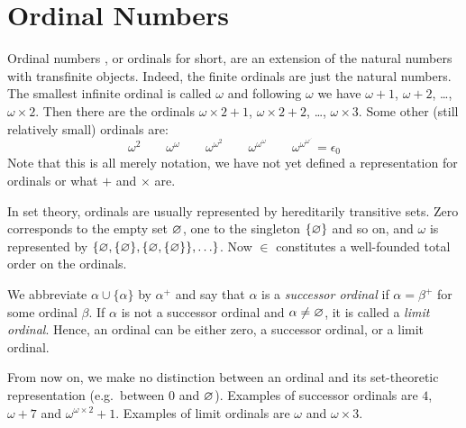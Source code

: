 


\section{Ordinal Numbers}\label{sec:ordinals}

Ordinal numbers \citep{cantor-15}, or ordinals for short, are an
extension of the natural numbers with transfinite objects. Indeed, the
finite ordinals are just the natural numbers. The smallest infinite
ordinal is called $\omega$ and following $\omega$ we have $\omega +
1$, $\omega + 2$, \ldots, $\omega \times 2$. Then there are the
ordinals $\omega \times 2 + 1$, $\omega \times 2 + 2$, \ldots, $\omega
\times 3$. Some other (still relatively small) ordinals are:
\begin{displaymath}
  \omega^2 \qquad
  \omega^\omega \qquad
  \omega^{\omega^2} \qquad
  \omega^{\omega^\omega} \qquad
  \omega^{\omega^{\omega^{\iddots}}} = \epsilon_0
\end{displaymath}
Note that this is all merely notation, we have not yet defined a
representation for ordinals or what $+$ and $\times$ are.

In set theory, ordinals are usually represented by hereditarily transitive
sets. Zero corresponds to the empty set $\varnothing$, one to the
singleton $\{ \varnothing \}$ and so on, and $\omega$ is represented by
$\{ \varnothing, \{ \varnothing \}, \{ \varnothing, \{ \varnothing \} \} , \ldots
\}$. Now $\in$ constitutes a well-founded total order on the
ordinals.

We abbreviate $\alpha \cup \{ \alpha \}$ by $\alpha^+$ and say that
$\alpha$ is a \emph{successor ordinal} if $\alpha = \beta^+$ for some
ordinal $\beta$. If $\alpha$ is not a successor ordinal and $\alpha
\neq \varnothing$, it is called a \emph{limit ordinal}. Hence, an ordinal
can be either zero, a successor ordinal, or a limit ordinal.

From now on, we make no distinction between an ordinal and its set-theoretic
representation (e.g.\ between $0$ and $\varnothing$). Examples of successor
ordinals are $4$, $\omega + 7$  and $\omega^{\omega \times 2} + 1$. Examples
of limit ordinals are $\omega$ and $\omega \times 3$.


